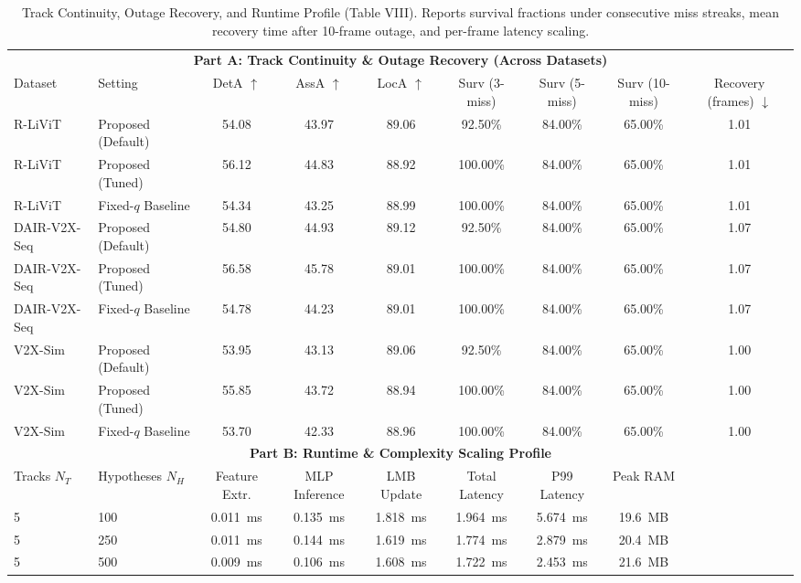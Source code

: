 \begin{table}[!t]
\caption{Track Continuity, Outage Recovery, and Runtime Profile (Table VIII). Reports survival fractions under consecutive miss streaks, mean recovery time after 10-frame outage, and per-frame latency scaling.}
\label{tab:continuity_and_runtime}
\centering
\small
\begin{tabular}{llccccccc}
\toprule
\multicolumn{9}{c}{\textbf{Part A: Track Continuity \& Outage Recovery (Across Datasets)}} \\
Dataset & Setting & DetA $\uparrow$ & AssA $\uparrow$ & LocA $\uparrow$ & Surv (3-miss) & Surv (5-miss) & Surv (10-miss) & Recovery (frames) $\downarrow$ \\
\midrule
R-LiViT & Proposed (Default) & 54.08 & 43.97 & 89.06 & 92.50\% & 84.00\% & 65.00\% & 1.01 \\
R-LiViT & Proposed (Tuned) & 56.12 & 44.83 & 88.92 & 100.00\% & 84.00\% & 65.00\% & 1.01 \\
R-LiViT & Fixed-$q$ Baseline & 54.34 & 43.25 & 88.99 & 100.00\% & 84.00\% & 65.00\% & 1.01 \\
\midrule
DAIR-V2X-Seq & Proposed (Default) & 54.80 & 44.93 & 89.12 & 92.50\% & 84.00\% & 65.00\% & 1.07 \\
DAIR-V2X-Seq & Proposed (Tuned) & 56.58 & 45.78 & 89.01 & 100.00\% & 84.00\% & 65.00\% & 1.07 \\
DAIR-V2X-Seq & Fixed-$q$ Baseline & 54.78 & 44.23 & 89.01 & 100.00\% & 84.00\% & 65.00\% & 1.07 \\
\midrule
V2X-Sim & Proposed (Default) & 53.95 & 43.13 & 89.06 & 92.50\% & 84.00\% & 65.00\% & 1.00 \\
V2X-Sim & Proposed (Tuned) & 55.85 & 43.72 & 88.94 & 100.00\% & 84.00\% & 65.00\% & 1.00 \\
V2X-Sim & Fixed-$q$ Baseline & 53.70 & 42.33 & 88.96 & 100.00\% & 84.00\% & 65.00\% & 1.00 \\
\midrule
\multicolumn{9}{c}{\textbf{Part B: Runtime \& Complexity Scaling Profile}} \\
Tracks $N_T$ & Hypotheses $N_H$ & Feature Extr. & MLP Inference & LMB Update & Total Latency & P99 Latency & Peak RAM \\
\midrule
5 & 100 & 0.011~ms & 0.135~ms & 1.818~ms & 1.964~ms & 5.674~ms & 19.6~MB \\
5 & 250 & 0.011~ms & 0.144~ms & 1.619~ms & 1.774~ms & 2.879~ms & 20.4~MB \\
5 & 500 & 0.009~ms & 0.106~ms & 1.608~ms & 1.722~ms & 2.453~ms & 21.6~MB \\

\end{tabular}
\end{table}
